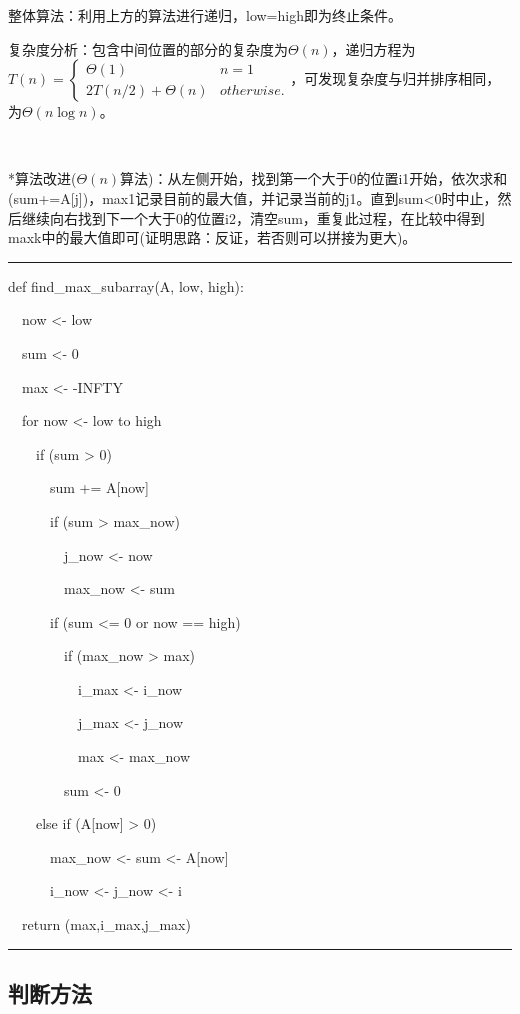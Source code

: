 \documentclass[a4paper,UTF8,fontset=windows]{ctexart}
\newenvironment{code}{\rule{36em}{0.1em}\setlength{\parindent}{1em}

}{

\setlength{\parindent}{0em}\rule{36em}{0.1em}}
\begin{document}
整体算法：利用上方的算法进行递归，low=high即为终止条件。

复杂度分析：包含中间位置的部分的复杂度为$\Theta(n)$，递归方程为$T(n)=\begin{cases}\Theta(1)&n=1\\2T(n/2)+\Theta(n)&otherwise.\end{cases}$，可发现复杂度与归并排序相同，为$\Theta(n\log n)$。

\

*\hspace{0em}算法改进($\Theta(n)$算法)：从左侧开始，找到第一个大于0的位置i1开始，依次求和(sum+=A[j])，max1记录目前的最大值，并记录当前的j1。直到sum<0时中止，然后继续向右找到下一个大于0的位置i2，清空sum，重复此过程，在比较中得到maxk中的最大值即可(证明思路：反证，若否则可以拼接为更大)。

\begin{code}
def find\_max\_subarray(A, low, high):

\ \ now <- low

\ \ sum <- 0

\ \ max <- -INFTY

\ \ for now <- low to high

\ \ \ \ if (sum > 0)

\ \ \ \ \ \ sum += A[now]

\ \ \ \ \ \ if (sum > max\_now)

\ \ \ \ \ \ \ \ j\_now <- now

\ \ \ \ \ \ \ \ max\_now <- sum

\ \ \ \ \ \ if (sum <= 0 or now == high)

\ \ \ \ \ \ \ \ if (max\_now > max)

\ \ \ \ \ \ \ \ \ \ i\_max <- i\_now

\ \ \ \ \ \ \ \ \ \ j\_max <- j\_now

\ \ \ \ \ \ \ \ \ \ max <- max\_now

\ \ \ \ \ \ \ \ sum <- 0

\ \ \ \ else if (A[now] > 0)

\ \ \ \ \ \ max\_now <- sum <- A[now]

\ \ \ \ \ \ i\_now <- j\_now <- i

\ \ return (max,i\_max,j\_max)

\end{code}


\subsection{判断方法}
\end{document}
